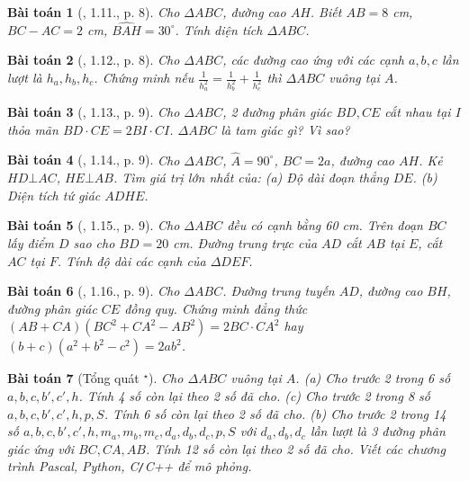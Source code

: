 \documentclass{article}
\newtheorem{baitoan}{Bài toán}
\begin{document}
\begin{baitoan}[\cite{TLCT_THCS_Toan_9_hinh_hoc}, 1.11., p. 8]
	Cho $\Delta ABC$, đường cao $AH$. Biết $AB = 8$ {\rm cm}, $BC - AC = 2$ {\rm cm}, $\widehat{BAH} = 30^\circ$. Tính diện tích $\Delta ABC$.
\end{baitoan}

\begin{baitoan}[\cite{TLCT_THCS_Toan_9_hinh_hoc}, 1.12., p. 8]
	Cho $\Delta ABC$, các đường cao ứng với các cạnh $a,b,c$ lần lượt là $h_a,h_b,h_c$. Chứng minh nếu $\frac{1}{h_a^2} = \frac{1}{h_b^2} + \frac{1}{h_c^2}$ thì $\Delta ABC$ vuông tại $A$.
\end{baitoan}

\begin{baitoan}[\cite{TLCT_THCS_Toan_9_hinh_hoc}, 1.13., p. 9]
	Cho $\Delta ABC$, 2 đường phân giác $BD,CE$ cắt nhau tại $I$ thỏa mãn $BD\cdot CE= 2BI\cdot CI$. $\Delta ABC$ là tam giác gì? Vì sao?
\end{baitoan}

\begin{baitoan}[\cite{TLCT_THCS_Toan_9_hinh_hoc}, 1.14., p. 9]
	Cho $\Delta ABC$, $\widehat{A} = 90^\circ$, $BC = 2a$, đường cao $AH$. Kẻ $HD\bot AC$, $HE\bot AB$. Tìm giá trị lớn nhất của: (a) Độ dài đoạn thẳng $DE$. (b) Diện tích tứ giác $ADHE$.
\end{baitoan}

\begin{baitoan}[\cite{TLCT_THCS_Toan_9_hinh_hoc}, 1.15., p. 9]
	Cho $\Delta ABC$ đều có cạnh bằng {\rm60 cm}. Trên đoạn $BC$ lấy điểm $D$ sao cho $BD = 20$ {\rm cm}. Đường trung trực của $AD$ cắt $AB$ tại $E$, cắt $AC$ tại $F$. Tính độ dài các cạnh của $\Delta DEF$.
\end{baitoan}

\begin{baitoan}[\cite{TLCT_THCS_Toan_9_hinh_hoc}, 1.16., p. 9]
	Cho $\Delta ABC$. Đường trung tuyến $AD$, đường cao $BH$, đường phân giác $CE$ đồng quy. Chứng minh đẳng thức $(AB + CA)(BC^2 + CA^2 - AB^2) = 2BC\cdot CA^2$ hay $(b + c)(a^2 + b^2 - c^2) = 2ab^2$.
\end{baitoan}

\begin{baitoan}[Tổng quát ${}^\star$]
	Cho $\Delta ABC$ vuông tại $A$. (a) Cho trước 2 trong 6 số $a,b,c,b',c',h$. Tính 4 số còn lại theo 2 số đã cho. (c) Cho trước 2 trong 8 số $a,b,c,b',c',h,p,S$. Tính 6 số còn lại theo 2 số đã cho. (b) Cho trước 2 trong 14 số $a,b,c,b',c',h,m_a,m_b,m_c,d_a,d_b,d_c,p,S$ với $d_a,d_b,d_c$ lần lượt là 3 đường phân giác ứng với $BC,CA,AB$. Tính 12 số còn lại theo 2 số đã cho. Viết các chương trình {\sf Pascal, Python, C\texttt{/}C++} để mô phỏng.
\end{baitoan}
\end{document}
